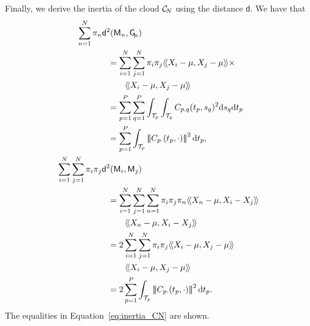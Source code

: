 Finally, we derive the inertia of the cloud $\mathcal{C}_{\!N}$ using the distance $\mathsf{d}$. We have that
\begin{align}
\sum_{n = 1}^N \pi_n \mathsf{d}^2(\pfea{M}_n, \Gfea) & \\
    &\mkern-72mu = \sum_{i = 1}^N \sum_{j = 1}^N \pi_i \pi_j \inH{X_i - \mu}{X_j - \mu} \times \\
    &\mkern-36mu \inH{X_i - \mu}{X_j - \mu} \\
    &\mkern-72mu = \sum_{p = 1}^P \sum_{q = 1}^P \int_{\TT{p}} \int_{\TT{q}} C_{p,q}(t_p, s_q)^2 \dd s_q \dd t_p \\
    &\mkern-72mu = \sum_{p = 1}^P \int_{\TT{p}} \normH{C_{p \cdot}(t_p, \cdot)}^2 \dd t_p,\\
\sum_{i = 1}^N \sum_{j = 1}^N \pi_i \pi_j \mathsf{d}^2(\pfea{M}_i, \pfea{M}_j) & \\
    &\mkern-72mu = \sum_{i = 1}^N \sum_{j = 1}^N \sum_{n = 1}^N \pi_i \pi_j \pi_n \inH{X_n - \mu}{X_i - X_j}\\
    &\mkern-36mu \inH{X_n - \mu}{X_i - X_j} \\
    &\mkern-72mu = 2\sum_{i = 1}^N \sum_{j = 1}^N \pi_i \pi_j \inH{X_i - \mu}{X_j - \mu} \\
    &\mkern-36mu \inH{X_i - \mu}{X_j - \mu} \\
    &\mkern-72mu = 2\sum_{p = 1}^P \int_{\TT{p}} \normH{C_{p \cdot}(t_p, \cdot)}^2 \dd t_p.
\end{align}
The equalities in Equation~\eqref{eq:inertia_CN} are shown.

